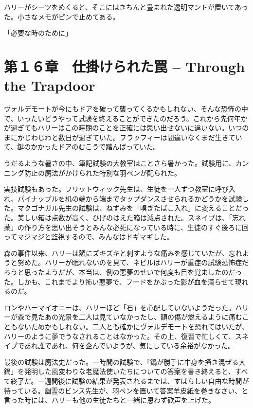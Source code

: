 \documentclass[10pt,a4paper]{article}
\begin{document}
\begin{CJK}{UTF8}{min}
ハリーがシーツをめくると、そこにはきちんと畳まれた透明マントが置いてあった。小さなメモがピンで止めてある。

「必要な時のために」




\section{第１６章　仕掛けられた罠 -- Through the Trapdoor}





ヴォルデモートが今にもドアを破って襲ってくるかもしれない、そんな恐怖の中で、いったいどうやって試験を終えることができたのだろう。これから先何年かが過ぎてもハリーはこの時期のことを正確には思い出せないに違いない。いつのまにかじわじわと数日が過ぎていた。フラッフィーは間違いなくまだ生きていて、鍵のかかったドアのむこうで踏んばっていた。

うだるような暑さの中、筆記試験の大教室はことさら暑かった。試験用に、カンニング防止の魔法がかけられた特別な羽ペンが配られた。

実技試験もあった。フリットウィック先生は、生徒を一人ずつ教室に呼び入れ、パイナップルを机の端から端までタップダンスさせられるかどうかを試験した。マクゴナガル先生の試験は、ねずみを「嗅ぎたばこ入れ」に変えることだった。美しい箱は点数が高く、ひげのはえた箱は減点された。スネイプは、「忘れ薬」の作り方を思い出そうとみんな必死になっている時に、生徒のすぐ後ろに回ってマジマジと監視するので、みんなはドギマギした。

森の事件以来、ハリーは額にズキズキと刺すような痛みを感じていたが、忘れようと努めた。ハリーが眠れないのを見て、ネビルはハリーが重症の試験恐怖症だろうと思ったようだが、本当は、例の悪夢のせいで何度も目を覚ましたのだった。しかも、これまでより怖い悪夢で、フードをかぶった影が血を滴らせて現れるのだ。

ロンやハーマイオニーは、ハリーほど「石」を心配していないようだった。ハリーが森で見たあの光景を二人は見ていなかったし、額の傷が燃えるように痛むこともないためかもしれない。二人とも確かにヴォルデモートを恐れてはいたが、ハリーのように夢でうなされることはなかった。その上、復習で忙しくて、スネイプであれ誰であれ、何を企んでいようが、気にしている余裕がなかった。

最後の試験は魔法史だった。一時間の試験で、「鍋が勝手に中身を掻き混ぜる大鍋」を発明した風変わりな老魔法使いたちについての答案を書き終えると、すべて終了だ。一週間後に試験の結果が発表されるまでは、すばらしい自由な時間が待っている。幽霊のビンス先生が、羽ペンを置いて答案羊皮紙を巻きなさい、と言った時には、ハリーも他の生徒たちと一緒に恩わず歓声を上げた。


\end{CJK}
\end{document}
